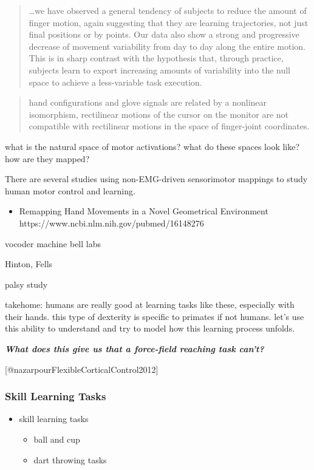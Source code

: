 \begin{quote}
\ldots we have observed a general tendency of subjects to reduce the
amount of finger motion, again suggesting that they are learning
trajectories, not just final positions or by points. Our data also show
a strong and progressive decrease of movement variability from day to
day along the entire motion. This is in sharp contrast with the
hypothesis that, through practice, subjects learn to export increasing
amounts of variability into the null space to achieve a less-variable
task execution.
\end{quote}

\begin{quote}
hand configurations and glove signals are related by a nonlinear
isomorphism, rectilinear motions of the cursor on the monitor are not
compatible with rectilinear motions in the space of finger-joint
coordinates.
\end{quote}

what is the natural space of motor activations? what do these spaces
look like? how are they mapped?

There are several studies using non-EMG-driven sensorimotor mappings to
study human motor control and learning.

\begin{itemize}
\tightlist
\item
  Remapping Hand Movements in a Novel Geometrical Environment
  https://www.ncbi.nlm.nih.gov/pubmed/16148276
\end{itemize}

vocoder machine bell labs

Hinton, Fells

palsy study

takehome: humans are really good at learning tasks like these,
especially with their hands. this type of dexterity is specific to
primates if not humans. let's use this ability to understand and try to
model how this learning process unfolds.

\textbf{\emph{What does this give us that a force-field reaching task
can't?}}

{[}@nazarpourFlexibleCorticalControl2012{]}

\subsubsection{Skill Learning Tasks}\label{skill-learning-tasks}

\begin{itemize}
\tightlist
\item
  skill learning tasks

  \begin{itemize}
  \tightlist
  \item
    ball and cup
  \item
    dart throwing tasks
  \end{itemize}
\end{itemize}

